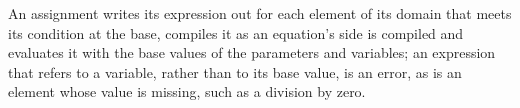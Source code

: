 An assignment writes its expression out for each element of its domain that
meets its condition at the base, compiles it as an equation's side is
compiled and evaluates it with the base values of the parameters and
variables; an expression that refers to a variable, rather than to its base
value, is an error, as is an element whose value is missing, such as a
division by zero.


\begin{alsosee}
\end{alsosee}
